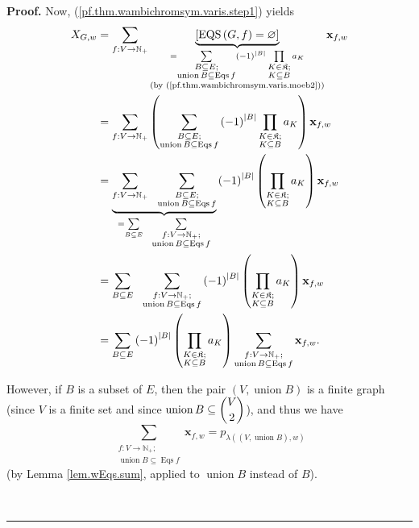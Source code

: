 \documentclass[numbers=enddot,12pt,final,onecolumn,notitlepage]{scrartcl}%
\theoremstyle{definition}
\newenvironment{proof}[1][Proof]{\noindent\textbf{#1.} }{\ \rule{0.5em}{0.5em}}
\newenvironment{verlong}{}{}
\let\sumnonlimits\sum
\let\prodnonlimits\prod
\renewcommand{\sum}{\sumnonlimits\limits}
\renewcommand{\prod}{\prodnonlimits\limits}
\begin{document}
\begin{verlong}
\begin{proof}
Now, (\ref{pf.thm.wambichromsym.varis.step1}) yields%
\begin{align}
X_{G,w}  &  =\sum_{f:V\rightarrow\mathbb{N}_{+}}\underbrace{\left[
\operatorname*{EQS}\left(  G,f\right)  =\varnothing\right]  }_{\substack{=\sum
_{\substack{B\subseteq E;\\\operatorname*{union}B\subseteq\operatorname*{Eqs}%
f}}\left(  -1\right)  ^{\left\vert B\right\vert }\prod_{\substack{K\in
\mathfrak{K};\\K\subseteq B}}a_{K}\\\text{(by
(\ref{pf.thm.wambichromsym.varis.moeb2}))}}}\mathbf{x}_{f,w}\nonumber\\
&  =\sum_{f:V\rightarrow\mathbb{N}_{+}}\left(  \sum_{\substack{B\subseteq
E;\\\operatorname*{union}B\subseteq\operatorname*{Eqs}f}}\left(  -1\right)
^{\left\vert B\right\vert }\prod_{\substack{K\in\mathfrak{K};\\K\subseteq
B}}a_{K}\right)  \mathbf{x}_{f,w}\nonumber\\
&  =\underbrace{\sum_{f:V\rightarrow\mathbb{N}_{+}}\ \ \sum
_{\substack{B\subseteq E;\\\operatorname*{union}B\subseteq\operatorname*{Eqs}%
f}}}_{=\sum_{B\subseteq E}\ \ \sum_{\substack{f:V\rightarrow\mathbb{N}%
_{+};\\\operatorname*{union}B\subseteq\operatorname*{Eqs}f}}}\left(
-1\right)  ^{\left\vert B\right\vert }\left(  \prod_{\substack{K\in
\mathfrak{K};\\K\subseteq B}}a_{K}\right)  \mathbf{x}_{f,w}\nonumber\\
&  =\sum_{B\subseteq E}\ \ \sum_{\substack{f:V\rightarrow\mathbb{N}%
_{+};\\\operatorname*{union}B\subseteq\operatorname*{Eqs}f}}\left(  -1\right)
^{\left\vert B\right\vert }\left(  \prod_{\substack{K\in\mathfrak{K}%
;\\K\subseteq B}}a_{K}\right)  \mathbf{x}_{f,w}\nonumber\\
&  =\sum_{B\subseteq E}\left(  -1\right)  ^{\left\vert B\right\vert }\left(
\prod_{\substack{K\in\mathfrak{K};\\K\subseteq B}}a_{K}\right)  \sum
_{\substack{f:V\rightarrow\mathbb{N}_{+};\\\operatorname*{union}%
B\subseteq\operatorname*{Eqs}f}}\mathbf{x}_{f,w}.
\label{pf.thm.wambichromsym.varis.step4}%
\end{align}


However, if $B$ is a subset of $E$, then the pair $\left(
V,\operatorname*{union}B\right)  $ is a finite graph (since $V$ is a finite
set and since $\operatorname*{union}B\subseteq\dbinom{V}{2}$), and thus we
have%
\begin{equation}
\sum_{\substack{f:V\rightarrow\mathbb{N}_{+};\\\operatorname*{union}%
B\subseteq\operatorname*{Eqs}f}}\mathbf{x}_{f,w}=p_{\lambda\left(  \left(
V,\operatorname*{union}B\right)  ,w\right)  }
\label{pf.thm.wambichromsym.varis.p}%
\end{equation}
(by Lemma \ref{lem.wEqs.sum}, applied to $\operatorname*{union}B$ instead of
$B$).


\end{proof}
\end{verlong}
\end{document}
